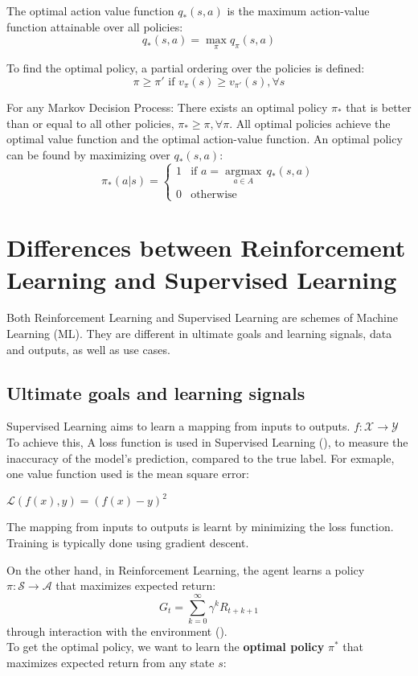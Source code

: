\documentclass{article} %
\begin{document}
The optimal action value function \( q_*(s, a) \) is the maximum action-value function attainable over all policies:
\[
q_*(s, a) = \max_{\pi} q_\pi(s, a)
\]

To find the optimal policy, a partial ordering over the policies is defined:
\[
\pi \geq \pi' \text{ if } v_{\pi}(s) \geq v_{\pi'}(s), \forall s
\]

For any Markov Decision Process:
There exists an optimal policy $\pi_{*}$ that is better than or equal to all other policies, $\pi_{*} \geq \pi, \forall \pi$. All optimal policies achieve the optimal value function and the optimal action-value function.
An optimal policy can be found by maximizing over \( q_*(s, a) \):
\[
\pi_*(a|s) =
\begin{cases} 
1 & \text{if } a = \underset{a \in A}{\operatorname{argmax}} \, q_*(s, a) \\
0 & \text{otherwise}
\end{cases}
\]

\section{Differences between Reinforcement Learning and Supervised Learning}
\label{gen_inst}

Both Reinforcement Learning and Supervised Learning are schemes of Machine Learning (ML). They are different in ultimate goals and learning signals, data and outputs, as well as use cases.

\subsection{Ultimate goals and learning signals}
Supervised Learning aims to learn a mapping from inputs to outputs.
$f: \mathcal{X} \rightarrow \mathcal{Y}$
To achieve this, A loss function is used in Supervised Learning (\cite{goodfellow2016deep}), to measure the inaccuracy of the model’s prediction, compared to the true label. For exmaple, one value function used is the mean square error:
\begin{center}
    $\mathcal{L}(f(x), y) = (f(x) - y)^2$
\end{center}
The mapping from inputs to outputs is learnt by minimizing the loss function. Training is typically done using gradient descent. 

On the other hand, in Reinforcement Learning, the agent learns a policy \(\pi : \mathcal{S} \to \mathcal{A}\) 
that maximizes expected return:
\[G_t = \sum_{k=0}^\infty \gamma^k R_{t+k+1}\]
through interaction with the environment (\cite{sutton2018reinforcement}). \\
To get the optimal policy, we want to learn the \textbf{optimal policy} \(\pi^*\) that maximizes expected return from any state \(s\):
\end{document}
